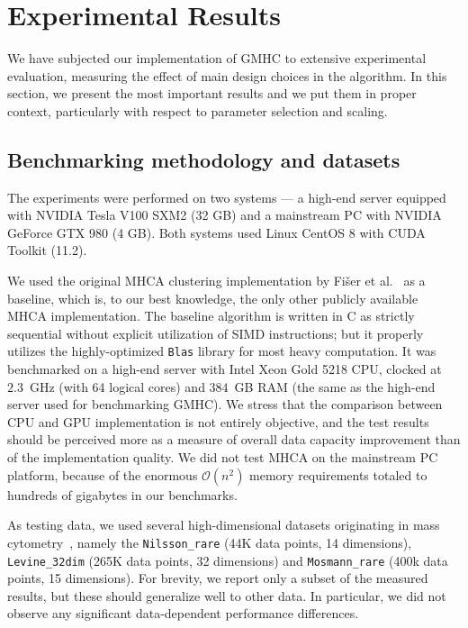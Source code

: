 \section{Experimental Results}\label{sec:experiments}

We have subjected our implementation of GMHC to extensive experimental evaluation, measuring the effect of main design choices in the algorithm.
In this section, we present the most important results and we put them in proper context, particularly with respect to parameter selection and scaling.

\subsection{Benchmarking methodology and datasets}

The experiments were performed on two systems --- a high-end server equipped with NVIDIA Tesla V100 SXM2 (32 GB) and a mainstream PC with NVIDIA GeForce GTX 980 (4 GB).
Both systems used Linux CentOS 8 with CUDA Toolkit (11.2).

We used the original MHCA clustering implementation by Fišer et al.~\cite{fivser2012detection} as a baseline, which is, to our best knowledge, the only other publicly available MHCA implementation.
The baseline algorithm is written in C as strictly sequential without explicit utilization of SIMD instructions; but it properly utilizes the highly-optimized \texttt{Blas} library for most heavy computation.
It was benchmarked on a high-end server with Intel Xeon Gold 5218 CPU, clocked at $2.3$~GHz (with 64 logical cores) and $384$~GB RAM (the same as the high-end server used for benchmarking GMHC).
We stress that the comparison between CPU and GPU implementation is not entirely objective, and the test results should be perceived more as a measure of overall data capacity improvement than of the implementation quality.
We did not test MHCA on the mainstream PC platform, because of the enormous $\mathcal{O}(n^2)$ memory requirements totaled to hundreds of gigabytes in our benchmarks.

As testing data, we used several high-dimensional datasets originating in mass cytometry~\cite{weber2016comparison}, namely the \texttt{Nilsson\_rare} (44K data points, 14 dimensions), \texttt{Levine\_32dim} (265K data points, 32 dimensions) and \texttt{Mosmann\_rare} (400k data points, 15 dimensions).
For brevity, we report only a subset of the measured results, but these should generalize well to other data.
In particular, we did not observe any significant data-dependent performance differences.

